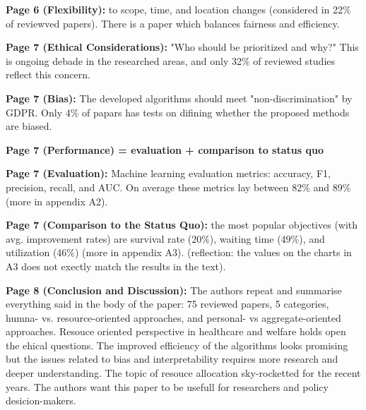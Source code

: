     \textbf{Page 6 (Flexibility):} 
    to scope, time, and location changes (considered in 22\% of reviewved papers). There is a paper which balances fairness and efficiency. 
    
    \textbf{Page 7 (Ethical Considerations):}
    "Who should be prioritized and why?" This is ongoing debade in the researched areas, and only 32\% of reviewed studies reflect this concern. 
    
    \textbf{Page 7 (Bias):}
    The developed algorithms should meet "non-discrimination" by GDPR. Only 4\% of papars has tests on difining whether the proposed methods are biased. 
    
    \textbf{Page 7 (Performance) = evaluation + comparison to status quo}
    
    \textbf{Page 7 (Evaluation):}
    Machine learning evaluation metrics: accuracy, F1, precision, recall, and AUC. On average these metrics lay between 82\% and 89\% (more in appendix A2).
    
    \textbf{Page 7 (Comparison to the Status Quo):}
    the most popular objectives (with avg. improvement rates) are survival rate (20\%), waiting time (49\%), and utilization (46\%) (more in appendix A3). (reflection: the values on the charts in A3 does not exectly match the results in the text).

    \textbf{Page 8 (Conclusion and Discussion):}
    The authors repeat and summarise everything said in the body of the paper: 75 reviewed papers, 5 categories, humna- vs. resource-oriented approaches, and personal- vs aggregate-oriented approaches. Resouce oriented perspective in healthcare and welfare holds open the ehical questions. The improved efficiency of the algorithms looks promising but the issues related to bias and interpretability requires more research and deeper understanding. The topic of resouce allocation sky-rocketted for the recent years. The authors want this paper to be usefull for researchers and policy desicion-makers.